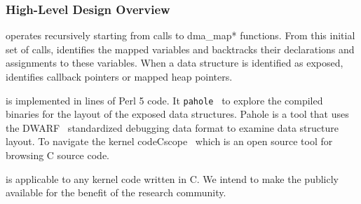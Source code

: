 


\subsubsection{High-Level Design Overview}

\tool operates recursively starting from calls to \DIFaddbegin {}\DIFaddend dma\_map* functions. From this initial set of calls, \tool identifies the mapped variables and backtracks their declarations and assignments to these variables. When a data structure is identified as exposed, \tool identifies \DIFdelbegin {}\DIFdelend \DIFaddbegin {}\DIFaddend callback pointers or mapped heap pointers. 



\tool is implemented in \DIFdelbegin \DIFdel{$\approx$}\DIFdelend \DIFaddbegin {} lines of Perl 5 code. It \DIFdelbegin {}\DIFdelend \DIFaddbegin {}\DIFaddend \texttt{pahole}~\cite{dwarves} to explore the compiled binaries for the layout of the exposed data structures. Pahole is a tool that uses the DWARF~\cite{dwarf} standardized debugging data format to examine data structure layout. To navigate the kernel code\DIFaddbegin \DIFadd{, }\DIFaddend \tool \DIFdelbegin {}\DIFdelend \DIFaddbegin {}\DIFaddend Cscope~\cite{cscope,cscope_92} which is an open source tool for browsing C source code.

\tool is applicable to any kernel code written in C. We intend to make the \tool publicly available for the benefit of the research community.


